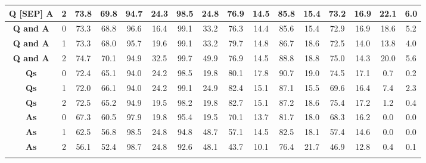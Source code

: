 \begin{table*}
{\begin{tabular}{|c|c||c|c|c|c|c|c|c|c|c|c|c|c|c|c|}
\textbf{Q [SEP] A} & 2 & 73.8 & 69.8 & 94.7 & 24.3 & 98.5 & 24.8 & 76.9 & 14.5 & 85.8 & 15.4 & 73.2 & 16.9 & 22.1 & 6.0\\ \hline
\textbf{Q and A} & 0 & 73.3 & 68.8 & 96.6 & 16.4 & 99.1 & 33.2 & 76.3 & 14.4 & 85.6 & 15.4 & 72.9 & 16.9 & 18.6 & 5.2\\ \hline
\textbf{Q and A} & 1 & 73.3 & 68.0 & 95.7 & 19.6 & 99.1 & 33.2 & 79.7 & 14.8 & 86.7 & 18.6 & 72.5 & 14.0 & 13.8 & 4.0\\ \hline
\textbf{Q and A} & 2 & 74.7 & 70.1 & 94.9 & 32.5 & 99.7 & 49.9 & 76.9 & 14.5 & 88.8 & 18.8 & 75.0 & 14.3 & 20.0 & 5.6\\ \hline
  \textbf{Qs} & 0 & 72.4 & 65.1 & 94.0 & 24.2 & 98.5 & 19.8 & 80.1 & 17.8 & 90.7 & 19.0 & 74.5 & 17.1 & 0.7 & 0.2\\ \hline
  \textbf{Qs} & 1 & 72.0 & 66.1 & 94.0 & 24.2 & 99.1 & 24.9 & 82.4 & 15.1 & 87.1 & 15.5 & 69.6 & 16.4 & 7.4 & 2.3\\ \hline
  \textbf{Qs} & 2 & 72.5 & 65.2 & 94.9 & 19.5 & 98.2 & 19.8 & 82.7 & 15.1 & 87.2 & 18.6 & 75.4 & 17.2 & 1.2 & 0.4\\ \hline
  \textbf{As} & 0 & 67.3 & 60.5 & 97.9 & 19.8 & 95.4 & 19.5 & 70.1 & 13.7 & 81.7 & 18.0 & 68.3 & 16.2 & 0.0 & 0.0\\ \hline
  \textbf{As} & 1 & 62.5 & 56.8 & 98.5 & 24.8 & 94.8 & 48.7 & 57.1 & 14.5 & 82.5 & 18.1 & 57.4 & 14.6 & 0.0 & 0.0\\ \hline
  \textbf{As} & 2 & 56.1 & 52.4 & 98.7 & 24.8 & 92.6 & 48.1 & 43.7 & 10.1 & 76.4 & 21.7 & 46.9 & 12.8 & 0.4 & 0.1\\ 
\fi
\end{tabular}
}
\end{table*}



